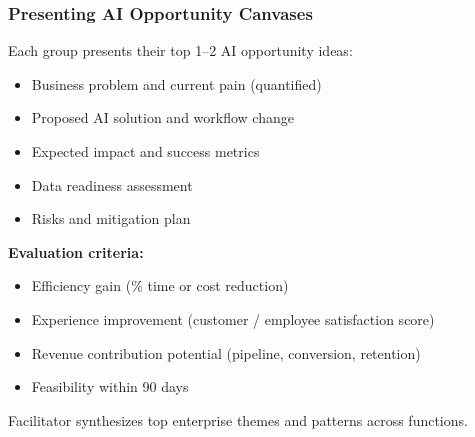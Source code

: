 \begin{frame}[fragile]\frametitle{Presenting AI Opportunity Canvases}

Each group presents their top 1--2 AI opportunity ideas:
\begin{itemize}
  \item Business problem and current pain (quantified)
  \item Proposed AI solution and workflow change
  \item Expected impact and success metrics
  \item Data readiness assessment
  \item Risks and mitigation plan
\end{itemize}

\textbf{Evaluation criteria:}
\begin{itemize}
  \item Efficiency gain (\% time or cost reduction)
  \item Experience improvement (customer / employee satisfaction score)
  \item Revenue contribution potential (pipeline, conversion, retention)
  \item Feasibility within 90 days
\end{itemize}

Facilitator synthesizes top enterprise themes and patterns across functions.

\end{frame}


